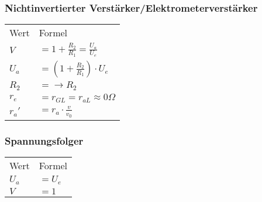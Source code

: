     \subsubsection{Nichtinvertierter Verstärker/Elektrometerverstärker}
        \begin{minipage}{0.6\columnwidth}
            \renewcommand{\arraystretch}{1.1}
            \begin{table}[H]
                \begin{tabularx}{\columnwidth}{l l}
                    Wert  & Formel \\
                    $V$   & $=1+\frac{R_2}{R_1}=\frac{U_a}{U_e}$ \\
                    $U_a$ & $=(1+\frac{R_2}{R_1})\cdot U_e$ \\
                    $R_2$ & $=\longrightarrow R_2$\\
                    $r_e$ & $=r_{GL}=r_{aL}\approx 0\Omega$ \\
                    $r_a'$& $=r_a\cdot\frac{v}{v_0}$\\
                \end{tabularx}
            \end{table}
        \end{minipage}
        \begin{minipage}{0.4\columnwidth}
        \end{minipage}
    \subsubsection{Spannungsfolger}
        \begin{minipage}{0.6\columnwidth}
            \begin{table}[H]
                \begin{tabularx}{\columnwidth}{l l}
                    Wert  & Formel \\
                    $U_a$ & $=U_e$ \\
                    $V$   & $=1$ \\
                \end{tabularx}
            \end{table}
        \end{minipage}
        \begin{minipage}{0.4\columnwidth}
        \end{minipage}
